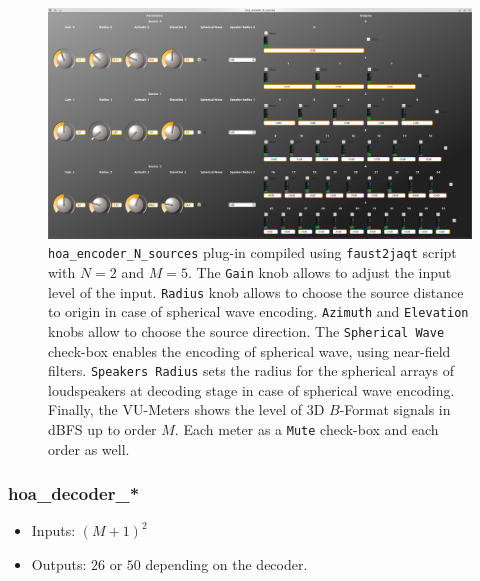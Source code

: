 \documentclass[10pt,a4paper]{article}
\begin{document}
\begin{figure}[!ht]
\includegraphics[width=\columnwidth]{hoa_encoder.png}
\caption{\lstinline'hoa_encoder_N_sources' plug-in compiled using \lstinline'faust2jaqt' script with $N=2$ and $M=5$. The \lstinline'Gain' knob allows to adjust the input level of the input. \lstinline'Radius' knob allows to choose the source distance to origin in case of spherical wave encoding. \lstinline'Azimuth' and \lstinline'Elevation' knobs allow to choose the source direction. The \lstinline'Spherical Wave' check-box enables the encoding of spherical wave, using near-field filters. \lstinline'Speakers Radius' sets the radius for the spherical arrays of loudspeakers at decoding stage in case of spherical wave encoding. Finally, the VU-Meters shows the level of 3D $B$-Format signals in dBFS up to order $M$. Each meter as a \lstinline'Mute' check-box and each order as well.}
\label{fig:hoa_encoder}
\end{figure}

\pagebreak
\subsubsection{hoa\_decoder\_*}
\label{sec:hoa_decoder}
\begin{itemize}
\item Inputs: $(M+1)^2$
\item Outputs: $26$ or $50$ depending on the decoder.
\end{itemize}
\end{document}
